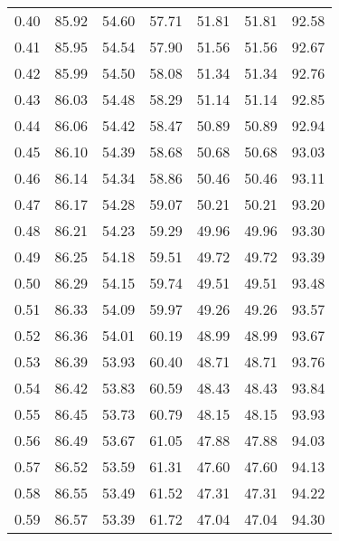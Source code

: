 \begin{tabular}{|c|c|c|c|c|c|c|}
      0.40 &     85.92 &     54.60 &      57.71 &   51.81 &      51.81 &         92.58 \\
      0.41 &     85.95 &     54.54 &      57.90 &   51.56 &      51.56 &         92.67 \\
      0.42 &     85.99 &     54.50 &      58.08 &   51.34 &      51.34 &         92.76 \\
      0.43 &     86.03 &     54.48 &      58.29 &   51.14 &      51.14 &         92.85 \\
      0.44 &     86.06 &     54.42 &      58.47 &   50.89 &      50.89 &         92.94 \\
      0.45 &     86.10 &     54.39 &      58.68 &   50.68 &      50.68 &         93.03 \\
      0.46 &     86.14 &     54.34 &      58.86 &   50.46 &      50.46 &         93.11 \\
      0.47 &     86.17 &     54.28 &      59.07 &   50.21 &      50.21 &         93.20 \\
      0.48 &     86.21 &     54.23 &      59.29 &   49.96 &      49.96 &         93.30 \\
      0.49 &     86.25 &     54.18 &      59.51 &   49.72 &      49.72 &         93.39 \\
      0.50 &     86.29 &     54.15 &      59.74 &   49.51 &      49.51 &         93.48 \\
      0.51 &     86.33 &     54.09 &      59.97 &   49.26 &      49.26 &         93.57 \\
      0.52 &     86.36 &     54.01 &      60.19 &   48.99 &      48.99 &         93.67 \\
      0.53 &     86.39 &     53.93 &      60.40 &   48.71 &      48.71 &         93.76 \\
      0.54 &     86.42 &     53.83 &      60.59 &   48.43 &      48.43 &         93.84 \\
      0.55 &     86.45 &     53.73 &      60.79 &   48.15 &      48.15 &         93.93 \\
      0.56 &     86.49 &     53.67 &      61.05 &   47.88 &      47.88 &         94.03 \\
      0.57 &     86.52 &     53.59 &      61.31 &   47.60 &      47.60 &         94.13 \\
      0.58 &     86.55 &     53.49 &      61.52 &   47.31 &      47.31 &         94.22 \\
      0.59 &     86.57 &     53.39 &      61.72 &   47.04 &      47.04 &         94.30 \\

\end{tabular}
